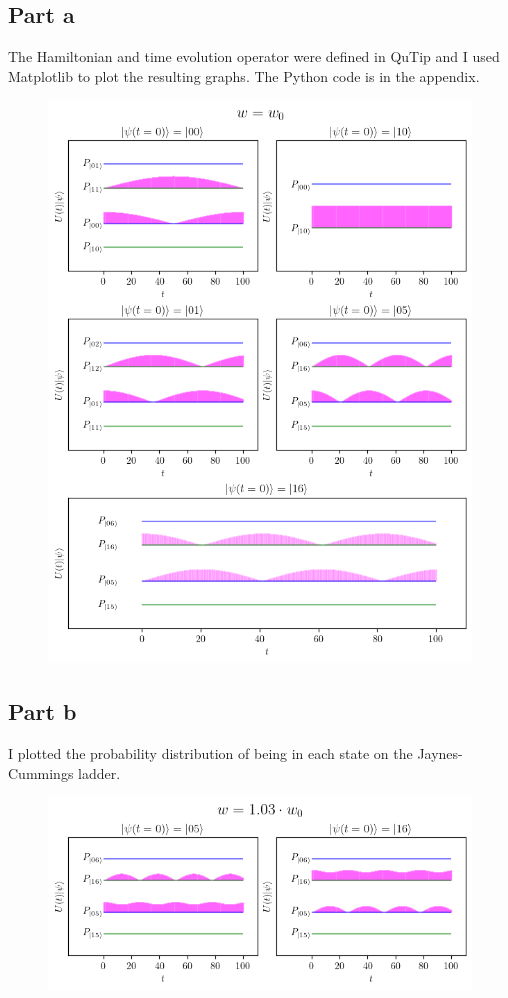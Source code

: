\subsection*{Part a}
The Hamiltonian and time evolution operator were defined in QuTip and I used Matplotlib to plot the resulting graphs. The Python code is in the appendix.
\begin{figure}[h]
    \centering
    \includegraphics[width=0.85\linewidth]{Resources//245//Homework 6/245 Homework 6 Problem 4a.png}
\end{figure}
\pagebreak
\subsection*{Part b}
I plotted the probability distribution of being in each state on the Jaynes-Cummings ladder.
\begin{figure}[h]
    \centering
    \includegraphics[width=1\linewidth]{Resources//245//Homework 6/245 Homework 6 Problem 4b.png}
\end{figure}
\newpage
